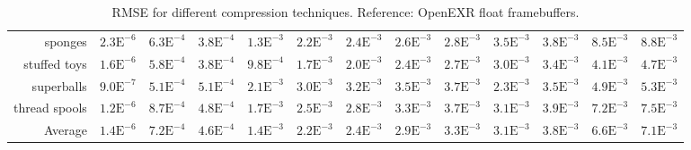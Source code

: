 \begin{landscape}
\begin{table}
\begin{tabularx}{\linewidth}{r | rr | rrrrrr | rrrr}
        sponges  & \footnotesize{$2.3\mathrm{E}^{-6}$}& \footnotesize{$6.3\mathrm{E}^{-4}$}& \footnotesize{$3.8\mathrm{E}^{-4}$}& \footnotesize{$1.3\mathrm{E}^{-3}$}& \footnotesize{$2.2\mathrm{E}^{-3}$}& \footnotesize{$2.4\mathrm{E}^{-3}$}& \footnotesize{$2.6\mathrm{E}^{-3}$}& \footnotesize{$2.8\mathrm{E}^{-3}$}& \footnotesize{$3.5\mathrm{E}^{-3}$}& \footnotesize{$3.8\mathrm{E}^{-3}$}& \footnotesize{$8.5\mathrm{E}^{-3}$}& \footnotesize{$8.8\mathrm{E}^{-3}$}\\
        stuffed toys  & \footnotesize{$1.6\mathrm{E}^{-6}$}& \footnotesize{$5.8\mathrm{E}^{-4}$}& \footnotesize{$3.8\mathrm{E}^{-4}$}& \footnotesize{$9.8\mathrm{E}^{-4}$}& \footnotesize{$1.7\mathrm{E}^{-3}$}& \footnotesize{$2.0\mathrm{E}^{-3}$}& \footnotesize{$2.4\mathrm{E}^{-3}$}& \footnotesize{$2.7\mathrm{E}^{-3}$}& \footnotesize{$3.0\mathrm{E}^{-3}$}& \footnotesize{$3.4\mathrm{E}^{-3}$}& \footnotesize{$4.1\mathrm{E}^{-3}$}& \footnotesize{$4.7\mathrm{E}^{-3}$}\\
        superballs  & \footnotesize{$9.0\mathrm{E}^{-7}$}& \footnotesize{$5.1\mathrm{E}^{-4}$}& \footnotesize{$5.1\mathrm{E}^{-4}$}& \footnotesize{$2.1\mathrm{E}^{-3}$}& \footnotesize{$3.0\mathrm{E}^{-3}$}& \footnotesize{$3.2\mathrm{E}^{-3}$}& \footnotesize{$3.5\mathrm{E}^{-3}$}& \footnotesize{$3.7\mathrm{E}^{-3}$}& \footnotesize{$2.3\mathrm{E}^{-3}$}& \footnotesize{$3.5\mathrm{E}^{-3}$}& \footnotesize{$4.9\mathrm{E}^{-3}$}& \footnotesize{$5.3\mathrm{E}^{-3}$}\\
        thread spools  & \footnotesize{$1.2\mathrm{E}^{-6}$}& \footnotesize{$8.7\mathrm{E}^{-4}$}& \footnotesize{$4.8\mathrm{E}^{-4}$}& \footnotesize{$1.7\mathrm{E}^{-3}$}& \footnotesize{$2.5\mathrm{E}^{-3}$}& \footnotesize{$2.8\mathrm{E}^{-3}$}& \footnotesize{$3.3\mathrm{E}^{-3}$}& \footnotesize{$3.7\mathrm{E}^{-3}$}& \footnotesize{$3.1\mathrm{E}^{-3}$}& \footnotesize{$3.9\mathrm{E}^{-3}$}& \footnotesize{$7.2\mathrm{E}^{-3}$}& \footnotesize{$7.5\mathrm{E}^{-3}$}\\
        \midrule
        Average& \footnotesize{$1.4\mathrm{E}^{-6}$}& \footnotesize{$7.2\mathrm{E}^{-4}$}& \footnotesize{$4.6\mathrm{E}^{-4}$}& \footnotesize{$1.4\mathrm{E}^{-3}$}& \footnotesize{$2.2\mathrm{E}^{-3}$}& \footnotesize{$2.4\mathrm{E}^{-3}$}& \footnotesize{$2.9\mathrm{E}^{-3}$}& \footnotesize{$3.3\mathrm{E}^{-3}$}& \footnotesize{$3.1\mathrm{E}^{-3}$}& \footnotesize{$3.8\mathrm{E}^{-3}$}& \footnotesize{$6.6\mathrm{E}^{-3}$}& \footnotesize{$7.1\mathrm{E}^{-3}$}\\
        \bottomrule
    \end{tabularx}
    \caption{RMSE for different compression techniques. Reference: OpenEXR float framebuffers.}
    \end{table}
\end{landscape}


